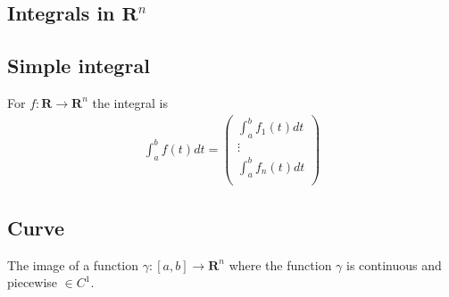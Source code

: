 \documentclass[8pt]{extarticle}
\newcommand{\R}{{\mathbb R}}
\newcommand{\ra}{{\rightarrow}}
\def\R{\mathbf{R}}
\begin{document}
\begin{multicols*}{3}
  \section{Integrals in $\R^n$}
  \hypertarget{sec:2}{}
  \subsection{Simple integral}
  For $f: \R \ra \R^n$ the integral is
  \begin{align*}
    \int_a^b f(t) dt =
    \begin{pmatrix}
      \int_a^b f_1(t) dt \\
      \vdots             \\
      \int_a^b f_n(t) dt \\
    \end{pmatrix}
  \end{align*}
  \subsection{Curve}
  The image of a function $\gamma: [a, b] \ra \R^n$
  where the function $\gamma$ is continuous and piecewise $\in C^1$.

\end{multicols*}
\end{document}
